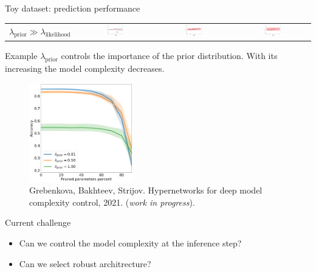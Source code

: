 \documentclass[usenames,dvipsnames,11pt,pdf,utf8,russian,aspectratio=169]{beamer}
\begin{document}
\begin{frame}{Toy dataset: prediction performance}
\begin{table}
\begin{tabular}{cccc}
          $\lambda_\text{prior} \gg \lambda_\text{likelihood}$   & \includegraphics[width=0.25\textwidth]{plot_0_2kld.png} & \includegraphics[width=0.25\textwidth]{plot_1kld.png} & \includegraphics[width=0.25\textwidth]{plot_10kld.png}\\
        \end{tabular}

    \end{table}
    
    
\end{frame}



\begin{frame}{Example}
$\lambda_\text{prior}$ controls the importance of the prior distribution. With its increasing the model complexity decreases. 

\begin{figure}[h]
\includegraphics[width=0.4\textwidth]{./cifar_hyper.png}
\caption*{\footnotesize Grebenkova, Bakhteev, Strijov. Hypernetworks for deep model complexity control, 2021. (\textit{work in progress}).}
\end{figure}
\end{frame}


\begin{frame}{Current challenge}
\begin{itemize}
\item Can we control the model complexity at the inference step?
\item Can we select robust architrecture?
\end{itemize}
\end{frame}
\end{document}
